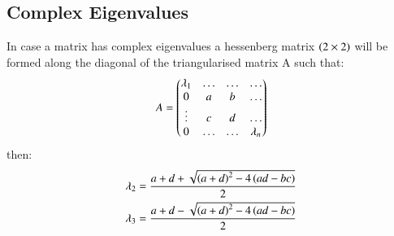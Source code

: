 \documentclass[journal,12pt,onecolumn]{IEEEtran}
\theoremstyle{remark}
\begin{document}
\subsection{Complex Eigenvalues}
In case a matrix has complex eigenvalues a hessenberg matrix $\left(2\times2\right)$ will be formed along the diagonal of the triangularised matrix A such that:
$$A=\begin{pmatrix}\lambda_1 & \dots & \dots & \dots \\ 0 & a & b & \dots\\ \vdots & c & d & \dots\\ 0 & \dots & \dots & \lambda_n\end{pmatrix}$$
then:
\begin{align*}
    \lambda_2=\frac{a+d+\sqrt{\left(a+d\right)^2-4\left(ad-bc\right)}}{2}\\
    \lambda_3=\frac{a+d-\sqrt{\left(a+d\right)^2-4\left(ad-bc\right)}}{2}\\
\end{align*}
\end{document}
